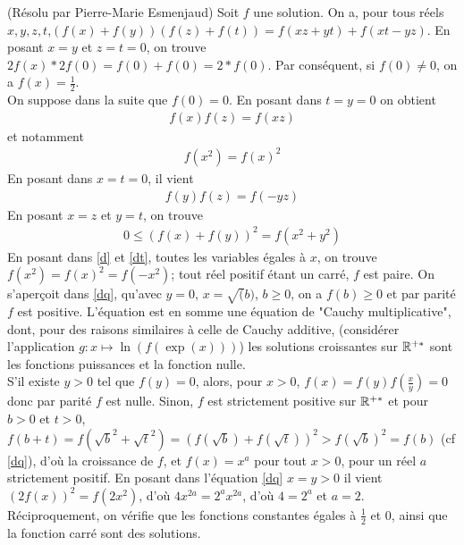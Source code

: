 \begin{sol}[53](R\'esolu par Pierre-Marie Esmenjaud)
		Soit $f$ une solution. 
		On a, pour tous r\'eels $x,y,z,t$,$(f(x)+f(y))(f(z)+f(t))=f(xz+yt)+f(xt-yz)$.
		En posant $x=y$ et $z=t=0$, on trouve $2f(x)*2f(0)=f(0)+f(0)=2*f(0)$. Par cons\'equent, si $f(0) \neq 0$, on a $f(x)=\frac{1}{2}$. \\
		On suppose dans la suite que $f(0)=0$. En posant dans  $t=y=0$ on obtient 
		\begin{align}
		\label{d}
				f(x)f(z)=f(xz)
		\end{align}
		et notamment 
		\begin{align}
		\label{db}
				f(x^2)=f(x)^2 
		\end{align}
		En posant dans  $x=t=0$, il vient 
		\begin{align}
		\label{dt}
				f(y)f(z)=f(-yz)
		\end{align}
		En posant $x=z$ et $y=t$, on trouve 
		\begin{align}
		\label{dq}
				0 \leq (f(x)+f(y))^2=f(x^2+y^2)
		\end{align}
		En posant dans \ref{d} et \ref{dt}, toutes les variables \'egales \`a $x$, on trouve $f(x^2)=f(x)^2=f(-x^2)$; tout r\'eel positif \'etant un carr\'e, $f$ est paire. 
		On s'aperçoit dans \ref{dq}, qu'avec $y=0$, $x=\sqrt(b)$, $b \geq 0$, on a $f(b) \geq 0$ et par parit\'e $f$ est positive. 
		L'\'equation est en somme une \'equation de "Cauchy multiplicative", dont, pour des raisons similaires \`a celle de Cauchy additive, (consid\'erer l'application $g:x \longmapsto \ln(f(\exp(x)))$) les solutions croissantes sur $\mathbb R^{+*}$ sont les fonctions puissances et la fonction nulle. \\
		S'il existe $y>0$ tel que $f(y)=0$, alors, pour $x>0$, $f(x)=f(y)f(\frac{x}{y})=0$ donc par parit\'e $f$ est nulle. 
		Sinon, $f$ est strictement positive sur $\mathbb R^{+*}$ et pour $b > 0$ et $t > 0$, $f(b+t)=f(\sqrt{b}^2+\sqrt{t}^2)=(f(\sqrt{b})+f(\sqrt{t}))^2 > f(\sqrt{b})^2=f(b)$ (cf \ref{dq}), d'o\`u la croissance de $f$, et $f(x)=x^a$ pour tout $x > 0$, pour un r\'eel $a$ strictement positif. 
		En posant dans l'\'equation \ref{dq} $x=y > 0$ il vient $(2f(x))^2=f(2x^2)$, d'o\`u $4x^{2a} = 2^ax^{2a}$, d'o\`u $4=2^a$ et $a=2$. \\
		R\'eciproquement, on v\'erifie que les fonctions constantes \'egales \`a $\frac{1}{2}$ et $0$, ainsi que la fonction carr\'e  sont des solutions. 
\end{sol}



